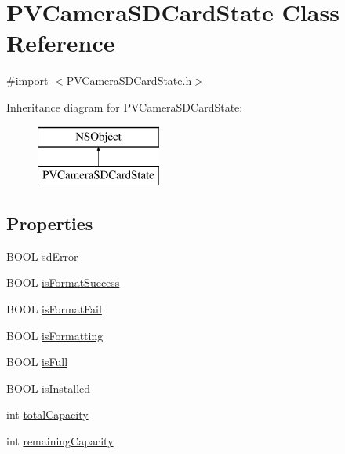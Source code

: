 \hypertarget{interface_p_v_camera_s_d_card_state}{}\section{P\+V\+Camera\+S\+D\+Card\+State Class Reference}
\label{interface_p_v_camera_s_d_card_state}


{\ttfamily \#import $<$P\+V\+Camera\+S\+D\+Card\+State.\+h$>$}

Inheritance diagram for P\+V\+Camera\+S\+D\+Card\+State\+:\begin{figure}[H]
\begin{center}
\leavevmode
\includegraphics[height=2.000000cm]{interface_p_v_camera_s_d_card_state}
\end{center}
\end{figure}
\subsection*{Properties}
\begin{DoxyCompactItemize}
\item 
B\+O\+OL \hyperlink{interface_p_v_camera_s_d_card_state_ad3b52c4ab0221ab298304695bc492f96}{sd\+Error}
\item 
B\+O\+OL \hyperlink{interface_p_v_camera_s_d_card_state_aa0d97b329076d812169387dd54e75626}{is\+Format\+Success}
\item 
B\+O\+OL \hyperlink{interface_p_v_camera_s_d_card_state_a9d6d298a360aeb26c3a7c198fcc0d660}{is\+Format\+Fail}
\item 
B\+O\+OL \hyperlink{interface_p_v_camera_s_d_card_state_ac54ae951bf262c9aa315360973f61a71}{is\+Formatting}
\item 
B\+O\+OL \hyperlink{interface_p_v_camera_s_d_card_state_ad3f062e3cc4d05c8f3771761e262b43a}{is\+Full}
\item 
B\+O\+OL \hyperlink{interface_p_v_camera_s_d_card_state_ac5440c4efbb4d69a535841063015f1a7}{is\+Installed}
\item 
int \hyperlink{interface_p_v_camera_s_d_card_state_a9cc5c54d277c7d8e09a1a9905bb2228e}{total\+Capacity}
\item 
int \hyperlink{interface_p_v_camera_s_d_card_state_a0f6a84b12858fa5784031df897ad6626}{remaining\+Capacity}
\end{DoxyCompactItemize}


